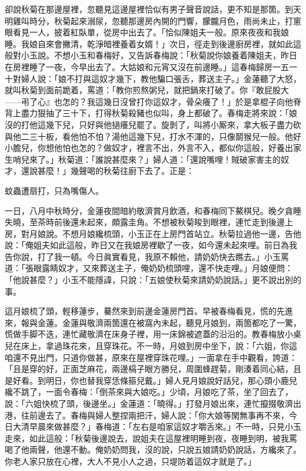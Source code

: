 卻說秋菊在那邊屋裡，忽聽見這邊屋裡恰似有男子聲音說話，更不知是那箇。到天明雞叫時分，秋菊起來溺尿，忽聽那邊房內開的門響，朦朧月色，雨尚未止，打窻眼看見一人，披着紅臥單，從房中出去了。「恰似陳姐夫一般。{}原來夜夜和我娘睡。我娘自來會撇清，乾淨暗裡養着女婿！」次日，徑走到後邊廚房裡，就如此這般對小玉說。不想小玉和春梅好，又告訴春梅說：「秋菊說你娘養着陳姐夫，昨日在房裡睡了一夜，今早出去了。大姑娘和元宵又沒在前邊睡。」這春梅歸房一五一十對婦人說：「娘不打與這奴才幾下，教他騙口張舌，葬送主子。」金蓮聽了大怒，就叫秋菊到面前跪着，罵道：「教你煎熬粥兒，就把鍋來打破了。你『敢屁股大——弔了心』也怎的？我這幾日沒曾打你這奴才，骨朵癢了！」於是拿棍子向他脊背上盡力狠抽了三十下，打得秋菊殺豬也似叫，身上都破了。{}春梅走將來說：「娘沒的打他這幾下兒，只好與他撾癢兒罷了。旋剝了，叫將小厮來，拿大板子盡力砍與他二三十板，看他怕不怕？湯他這幾下兒，打水不渾的，只像鬬猴兒一般。他好小膽兒，你想他怕也怎的？做奴才，裡言不出，外言不入，都似你這般，好養出家生哨兒來了。」{}秋菊道：「誰說甚麼來？」婦人道：「還說嘴哩！賊破家害主的奴才，還說甚麼！」幾聲喝的秋菊往廚下去了。正是：

\begin{myquote}
蚊蟲遭扇打，只為嘴傷人。
\end{myquote}

一日，八月中秋時分，金蓮夜間暗約敬濟賞月飲酒，和春梅同下鰲棋兒。晚夕貪睡失曉，至茶時前後還未起來，頗露圭角。不想被秋菊睃到眼裡，連忙走到後邊上房，對月娘說。不想月娘纔梳頭，小玉正在上房門首站立。秋菊拉過他一邊，告他說：「俺姐夫如此這般，昨日又在我娘房裡歇了一夜，如今還未起來哩。前日為我告你說，打了我一頓。今日眞實看見，我原不賴他，請奶奶快去瞧去。」小玉罵道：「張眼露睛奴才，又來葬送主子，俺奶奶梳頭哩，還不快走哩。」月娘便問：「他說甚麼？」小玉不能隱諱，只說：「五娘使秋菊來請奶奶說話。」更不說出別的事。

這月娘梳了頭，輕移蓮步，驀然來到前邊金蓮房門首。早被春梅看見，慌的先進來，報與金蓮。金蓮與敬濟兩箇還在被窩內未起，聽見月娘到，兩箇都吃了一驚，慌做手脚不迭，連忙藏敬濟在床身子裡，用一床錦被遮蓋的沿沿的。{}教春梅放小桌兒在床上，拿過珠花來，且穿珠花。不一時，月娘到房中坐下，說：「六姐，你這咱還不見出門，只道你做甚，原來在屋裡穿珠花哩。」一面拿在手中觀看，誇道：「且是穿的好，正面芝麻花，兩邊槅子眼方勝兒，周圍蜂趕菊，剛湊着同心結，且是好看。到明日，你也替我穿恁條箍兒戴。」婦人見月娘說好話兒，那心頭小鹿兒纔不跳了，一面令春梅：「倒茶來與大娘吃。」少頃，月娘吃了茶，坐了回去了，說：「六姐快梳了頭，後邊坐。」金蓮道：「曉得。」打發月娘出來，連忙攛掇敬濟出港，往前邊去了。春梅與婦人整捏兩把汗，婦人說：「你大娘等閑無事再不來，今日大清早晨來做甚麼？」春梅道：「左右是咱家這奴才嚼舌來。」不一時，只見小玉走來，如此這般：「秋菊後邊說去，說姐夫在這屋裡明睡到夜，夜睡到明，被我罵喝了他兩聲，他還不動。{}俺奶奶問我，沒的說，只說五娘請奶奶說話，方纔來了。你老人家只放在心裡，大人不見小人之過，只堤防着這奴才就是了。」

